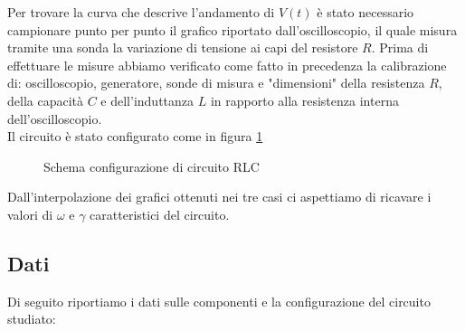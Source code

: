 \documentclass[letterpaper,12pt]{article}
\begin{document}
Per trovare la curva che descrive l'andamento di $V(t)$ è stato necessario campionare punto per punto il grafico riportato dall'oscilloscopio, il quale misura tramite una sonda la variazione di tensione ai capi del resistore $R$. Prima di effettuare le misure abbiamo verificato come fatto in precedenza la calibrazione di: oscilloscopio, generatore, sonde di misura e "dimensioni" della resistenza $R$, della capacità $C$ e dell'induttanza $L$ in rapporto alla resistenza interna dell'oscilloscopio.\\
Il circuito è stato configurato come in figura \ref{fig:config_circuito_RLC}\\

\begin{figure}[h!]
	\centering
	\caption{Schema configurazione di circuito RLC}
	\label{fig:config_circuito_RLC}
\end{figure}

Dall'interpolazione dei grafici ottenuti nei tre casi ci aspettiamo di ricavare i valori di $\omega$ e $\gamma$ caratteristici del circuito.
\newpage

\subsection{Dati} %
Di seguito riportiamo i dati sulle componenti e la configurazione del circuito studiato:
\end{document}
